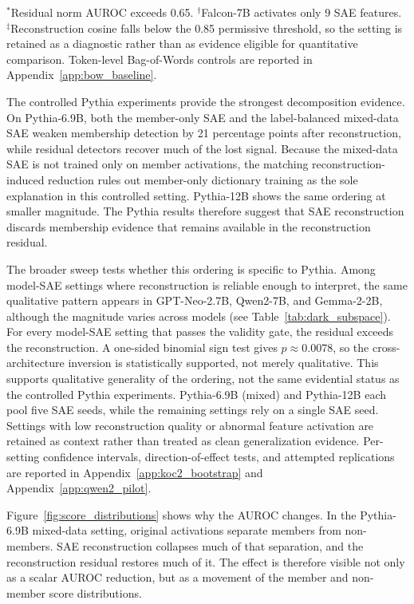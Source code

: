 \begin{table}[!t]
\vspace{0.5em}
\footnotesize{
$^{*}$Residual norm AUROC exceeds 0.65.
$^{\dagger}$Falcon-7B activates only 9 SAE features.
$^{\ddagger}$Reconstruction cosine falls below the 0.85 permissive threshold, so the setting is retained as a diagnostic rather than as evidence eligible for quantitative comparison.
Token-level Bag-of-Words controls are reported in Appendix~\ref{app:bow_baseline}.
}
\end{table}

The controlled Pythia experiments provide the strongest decomposition evidence. On Pythia-6.9B, both the member-only SAE and the label-balanced mixed-data
SAE weaken membership detection by 21 percentage points after reconstruction, while residual detectors recover much of the lost signal. Because the mixed-data SAE is not trained only on member activations, the matching reconstruction-induced reduction rules out member-only dictionary training as the sole explanation in this controlled setting. Pythia-12B shows the same ordering at smaller magnitude. The Pythia results therefore suggest that SAE
reconstruction discards membership evidence that remains available in the reconstruction residual.

The broader sweep tests whether this ordering is specific to Pythia. Among model-SAE settings where reconstruction is reliable enough to interpret, the same qualitative pattern appears in GPT-Neo-2.7B, Qwen2-7B, and Gemma-2-2B, although the magnitude varies across models (see Table~\ref{tab:dark_subspace}). For every model-SAE setting that passes the validity gate, the residual exceeds the reconstruction. A one-sided binomial sign test gives $p \approx 0.0078$, so the cross-architecture inversion is statistically supported, not merely qualitative. This supports qualitative generality of the ordering, not the same evidential status as the controlled Pythia experiments. Pythia-6.9B (mixed) and Pythia-12B each pool five SAE seeds, while the remaining settings rely on a single SAE seed. Settings with low reconstruction quality or abnormal
feature activation are retained as context rather than treated as clean generalization evidence. Per-setting confidence intervals, direction-of-effect
tests, and attempted replications are reported in Appendix~\ref{app:koc2_bootstrap} and Appendix~\ref{app:qwen2_pilot}.

Figure~\ref{fig:score_distributions} shows why the AUROC changes. In the Pythia-6.9B mixed-data setting, original activations separate members from non-
members. SAE reconstruction collapses much of that separation, and the reconstruction residual restores much of it. The effect is therefore visible not
only as a scalar AUROC reduction, but as a movement of the member and non-member score distributions.

